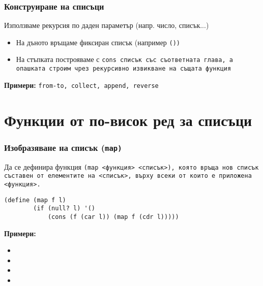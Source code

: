 \documentclass{beamer}
\begin{document}
\begin{frame}
  \frametitle{Конструиране на списъци}

  Използваме рекурсия по даден параметър (напр. число, списък...)
  \begin{itemize}
  \item На дъното връщаме фиксиран списък (например \tt{()})
  \item На стъпката построяваме с \tt{cons} списък със съответната глава, а опашката строим чрез рекурсивно извикване на същата функция
  \end{itemize}
  \pause
  \vspace{2em}
  \textbf{Примери:} \tt{from-to}, \tt{collect}, \tt{append}, \tt{reverse}
\end{frame}

\section{Функции от по-висок ред за списъци}

\begin{frame}[fragile]
  \frametitle{Изобразяване на списък (\tt{map})}

  Да се дефинира функция \tt{(map <функция> <списък>)}, която връща нов списък съставен от елементите на <списък>, върху всеки от които е приложена <функция>.\\
\begin{lstlisting}
(define (map f l)
        (if (null? l) '()
            (cons (f (car l)) (map f (cdr l)))))
\end{lstlisting}
  \pause
  \textbf{Примери:}
  \small
  \begin{itemize}[<+->]
  \item {}
  \item {}
  \item {}
  \item \scriptsize{}
  \end{itemize}
\end{frame}
\end{document}
